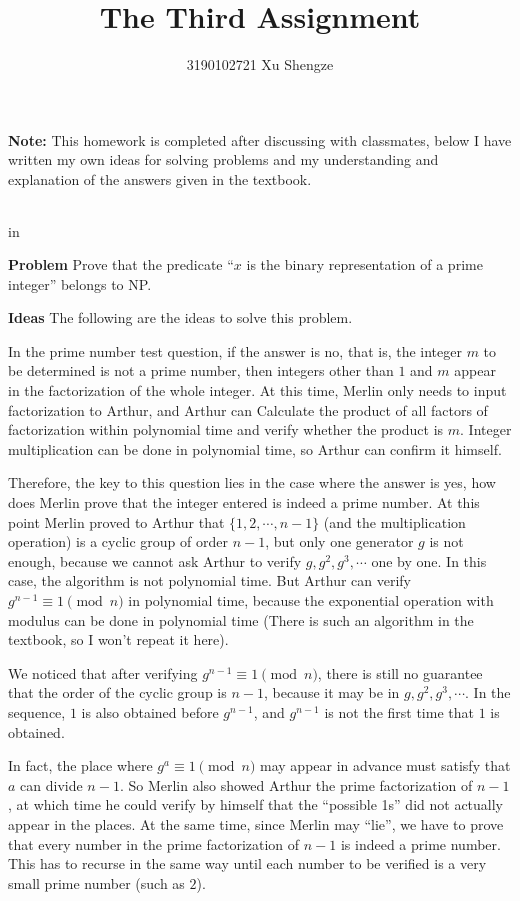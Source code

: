 \documentclass[11pt]{article}
\begin{document}
\title{{\bf The Third Assignment}}
\author{3190102721 Xu Shengze}
\date{}
\maketitle

{\bf Note:} This homework is completed after discussing with classmates, below I have written my own ideas for solving problems and my understanding and explanation of the answers given in the textbook.

\begin{tabular*}{13cm}{r}
\hline
\end{tabular*}

 in

{\bf Problem } Prove that the predicate ``$x$ is the binary representation of a prime integer'' belongs to NP.

{\bf Ideas} The following are the ideas to solve this problem.

In the prime number test question, if the answer is no, that is, the integer $m$ to be determined is not a prime number, then integers other than $1$ and $m$ appear in the factorization of the whole integer. At this time, Merlin only needs to input factorization to Arthur, and Arthur can Calculate the product of all factors of factorization within polynomial time and verify whether the product is $m$. Integer multiplication can be done in polynomial time, so Arthur can confirm it himself.

Therefore, the key to this question lies in the case where the answer is yes, how does Merlin prove that the integer entered is indeed a prime number. At this point Merlin proved to Arthur that $\{1,2,\cdots, n-1\}$ (and the multiplication operation) is a cyclic group of order $n-1$, but only one generator $g$ is not enough, because we cannot ask Arthur to verify $g,g^2, g^3,\cdots$ one by one. In this case, the algorithm is not polynomial time. But Arthur can verify $g^{n-1}\equiv1\pmod n$ in polynomial time, because the exponential operation with modulus can be done in polynomial time (There is such an algorithm in the textbook, so I won’t repeat it here).

We noticed that after verifying $g^{n-1}\equiv1\pmod n$, there is still no guarantee that the order of the cyclic group is $n-1$, because it may be in $g, g^2, g^3,\cdots$. In the sequence, $1$ is also obtained before $g^{n-1}$, and $g^{n-1}$ is not the first time that $1$ is obtained.

In fact, the place where $g^a\equiv1\pmod n$ may appear in advance must satisfy that $a$ can divide $n-1$. So Merlin also showed Arthur the prime factorization of $n-1$, at which time he could verify by himself that the ``possible 1s'' did not actually appear in the places. At the same time, since Merlin may ``lie'', we have to prove that every number in the prime factorization of $n-1$ is indeed a prime number. This has to recurse in the same way until each number to be verified is a very small prime number (such as $2$).
\end{document}
